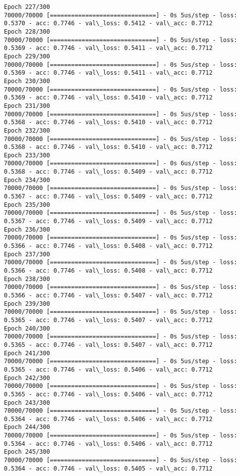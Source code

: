 \documentclass[11pt]{article}
\begin{document}
\begin{Verbatim}[commandchars=\\\{\}]
Epoch 227/300
70000/70000 [==============================] - 0s 5us/step - loss: 0.5370 - acc: 0.7746 - val\_loss: 0.5412 - val\_acc: 0.7712
Epoch 228/300
70000/70000 [==============================] - 0s 5us/step - loss: 0.5369 - acc: 0.7746 - val\_loss: 0.5411 - val\_acc: 0.7712
Epoch 229/300
70000/70000 [==============================] - 0s 5us/step - loss: 0.5369 - acc: 0.7746 - val\_loss: 0.5411 - val\_acc: 0.7712
Epoch 230/300
70000/70000 [==============================] - 0s 5us/step - loss: 0.5369 - acc: 0.7746 - val\_loss: 0.5410 - val\_acc: 0.7712
Epoch 231/300
70000/70000 [==============================] - 0s 5us/step - loss: 0.5368 - acc: 0.7746 - val\_loss: 0.5410 - val\_acc: 0.7712
Epoch 232/300
70000/70000 [==============================] - 0s 5us/step - loss: 0.5368 - acc: 0.7746 - val\_loss: 0.5410 - val\_acc: 0.7712
Epoch 233/300
70000/70000 [==============================] - 0s 6us/step - loss: 0.5368 - acc: 0.7746 - val\_loss: 0.5409 - val\_acc: 0.7712
Epoch 234/300
70000/70000 [==============================] - 0s 5us/step - loss: 0.5367 - acc: 0.7746 - val\_loss: 0.5409 - val\_acc: 0.7712
Epoch 235/300
70000/70000 [==============================] - 0s 5us/step - loss: 0.5367 - acc: 0.7746 - val\_loss: 0.5409 - val\_acc: 0.7712
Epoch 236/300
70000/70000 [==============================] - 0s 5us/step - loss: 0.5366 - acc: 0.7746 - val\_loss: 0.5408 - val\_acc: 0.7712
Epoch 237/300
70000/70000 [==============================] - 0s 5us/step - loss: 0.5366 - acc: 0.7746 - val\_loss: 0.5408 - val\_acc: 0.7712
Epoch 238/300
70000/70000 [==============================] - 0s 5us/step - loss: 0.5366 - acc: 0.7746 - val\_loss: 0.5407 - val\_acc: 0.7712
Epoch 239/300
70000/70000 [==============================] - 0s 5us/step - loss: 0.5365 - acc: 0.7746 - val\_loss: 0.5407 - val\_acc: 0.7712
Epoch 240/300
70000/70000 [==============================] - 0s 5us/step - loss: 0.5365 - acc: 0.7746 - val\_loss: 0.5407 - val\_acc: 0.7712
Epoch 241/300
70000/70000 [==============================] - 0s 5us/step - loss: 0.5365 - acc: 0.7746 - val\_loss: 0.5406 - val\_acc: 0.7712
Epoch 242/300
70000/70000 [==============================] - 0s 5us/step - loss: 0.5365 - acc: 0.7746 - val\_loss: 0.5406 - val\_acc: 0.7712
Epoch 243/300
70000/70000 [==============================] - 0s 5us/step - loss: 0.5364 - acc: 0.7746 - val\_loss: 0.5406 - val\_acc: 0.7712
Epoch 244/300
70000/70000 [==============================] - 0s 5us/step - loss: 0.5364 - acc: 0.7746 - val\_loss: 0.5406 - val\_acc: 0.7712
Epoch 245/300
70000/70000 [==============================] - 0s 5us/step - loss: 0.5364 - acc: 0.7746 - val\_loss: 0.5405 - val\_acc: 0.7712

\end{Verbatim}
\end{document}
